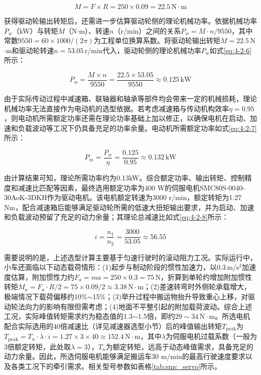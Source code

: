 {{{        \begin{equation}
        M = F\times R = 250\times0.09 = 22.5\,\mathrm{N\cdot m}
        \label{eq:4-2-5}
        \end{equation}

        获得驱动轮输出转矩后，还需进一步估算驱动轮侧的理论机械功率。依据机械功率$P_w$（kW）与转矩$M$（N$\cdot$m）、转速$n$（r/min）之间的关系$P_w = M\cdot n / 9550$，其中常数$9550 = 60 \times 1000/(2\pi)$为工程单位换算系数。将驱动轮输出转矩$M = 22.5$\,N$\cdot$m和驱动轮转速$n = 53.05$\,r/min代入，驱动轮侧的理论机械功率$P_w$如式\eqref{eq:4-2-6}所示：

        \begin{equation}
        P_w = \frac{M\times n}{9550} = \frac{22.5\times53.05}{9550} \approx 0.125\,\mathrm{kW}
        \label{eq:4-2-6}
        \end{equation}

        由于实际传动过程中减速箱、联轴器和轴承等部件均会带来一定的机械损耗，理论机械功率无法直接作为电动机的选型依据。若考虑减速箱与传动机构效率$\eta=0.95$，则电动机所需额定功率还需在理论功率基础上加以修正，以确保电机在启动、加速和负载波动等工况下仍具备充足的功率余量。电动机所需额定功率如式\eqref{eq:4-2-7}所示：

        \begin{equation}
        P_m = \frac{P_w}{\eta} = \frac{0.125}{0.95} \approx 0.132\,\mathrm{kW}
        \label{eq:4-2-7}
        \end{equation}

        由计算结果可知，理论所需功率约为0.13kW。综合额定功率、输出转矩、控制精度和减速比匹配等因素，最终选用额定功率为400 W的伺服电机SMC80S-0040-30AoK-3DKH作为驱动电机。该电机额定转速为3000 r/min，额定转矩为1.27 N\cdot m，配合减速箱后能够满足驱动轮所需的低速大扭矩输出要求，并为启动、加速和负载波动预留了充足的动力余量；其理论总减速比如式\eqref{eq:4-2-8}所示：

        \begin{equation}
        i = \frac{n_1}{n_2} = \frac{3000}{53.05} \approx 56.55
        \label{eq:4-2-8}
        \end{equation}

        需要说明的是，上述选型计算主要基于匀速行驶时的滚动阻力工况。实际运行中，小车还面临以下动态载荷情形：(1)起步与制动阶段的惯性加速力，以$0.3\,\mathrm{m/s^2}$加速度估算，附加惯性力约$F_a = ma = 250 \times 0.3 = 75\,\mathrm{N}$，折算到单轮约增加附加惯性转矩$M_a = F_a \cdot R / 2 = 75 \times 0.09 / 2 \approx 3.38 \, \mathrm{N\cdot m}$；(2)差速转弯时外侧轮承载增大，极端情况下载荷偏移约10\%$\sim$15\%；(3)举升过程中搬运物抬升导致重心上移，对驱动轮法向力的影响有限但需考虑；(4)地面不平整引起的附加载荷波动。综合上述工况，实际峰值转矩需求约为稳态值的1.3$\sim$1.5倍，即约$29\sim34\,\mathrm{N\cdot m}$。所选电机配合实际选用的40倍减速比（详见减速器选型小节）后的峰值输出转矩$T_{\text{peak}}$为$T_{\text{peak}} = T_n \cdot \lambda \cdot i = 1.27 \times 3 \times 40 \approx 152.4\,\mathrm{N\cdot m}$，其中$\lambda$为伺服电机过载系数（一般为3倍额定转矩，此处取$\lambda = 3$），$T_n$为额定转矩，远高于动态峰值需求，具备充足的动力余量。因此，所选伺服电机能够满足搬运车30 m/min的最高行驶速度要求以及各类工况下的牵引需求。相关型号参数如表格\ref{tab:smc_servo}所示。

}}}
